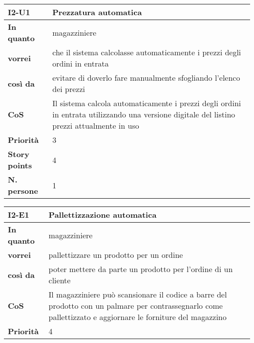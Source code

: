 \begin{table}[H]
  \begin{tabularx}{\textwidth}{lX}
    \toprule
    \textbf{I2-U1} & \textbf{Prezzatura automatica} \\
    \midrule
    \textbf{In quanto} & magazziniere \\
    \textbf{vorrei} & che il sistema calcolasse automaticamente i prezzi degli ordini in entrata \\
    \textbf{così da} & evitare di doverlo fare manualmente sfogliando l'elenco dei prezzi \\
    \midrule
    \textbf{CoS} & Il sistema calcola automaticamente i prezzi degli ordini in entrata utilizzando una versione digitale del listino prezzi attualmente in uso \\
    \midrule
    \textbf{Priorità} & 3 \\
    \textbf{Story points} & 4 \\
    \textbf{N. persone} & 1 \\
    \bottomrule
  \end{tabularx}
  \label{user-story:i2-u1}
\end{table}

\begin{table}[H]
  \begin{tabularx}{\textwidth}{lX}
    \toprule
    \textbf{I2-E1} & \textbf{Pallettizzazione automatica} \\
    \midrule
    \textbf{In quanto} & magazziniere \\
    \textbf{vorrei} & pallettizzare un prodotto per un ordine \\
    \textbf{così da} & poter mettere da parte un prodotto per l'ordine di un cliente \\
    \midrule
    \textbf{CoS} & Il magazziniere può scansionare il codice a barre del prodotto con un palmare per contrassegnarlo come pallettizzato e aggiornare le forniture del magazzino \\
    \midrule
    \textbf{Priorità} & 4 \\
    \bottomrule
  \end{tabularx}
  \label{user-story:i2-e1}
\end{table}

